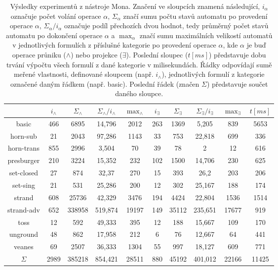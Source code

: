 \begin{table}
    \centering
    \begin{tabular}{ |c||c|c|c|c||c|c|c|c||c| } 
        \hline
         & $i_{\wedge}$ & $\Sigma_{\wedge}$ & $\Sigma_{\wedge} / i_{\wedge}$ & $\max_{\wedge}$ & $i_{\exists}$ & $\Sigma_{\exists}$ & $\Sigma_{\exists} / i_{\exists}$ & $\max_{\exists}$ & $t[ms]$ \\ 
        \hline\hline
        basic & 466 & 6895 & 14,796 & 2012 & 263 & 1369 & 5,205 & 839 & 5653 \\ 
        \hline
        horn-sub & 21 & 2043 & 97,286 & 1143 & 33 & 753 & 22,818 & 699 & 336 \\
        \hline 
        horn-trans & 855 & 2996 & 3,504 & 70 & 39 & 78 & 2 & 12 & 616 \\
        \hline 
        presburger & 210 & 3224 & 15,352 & 232 & 102 & 1500 & 14,706 & 230 & 625 \\
        \hline
        set-closed & 27 & 874 & 32,37 & 270 & 15 & 393 & 26,2 & 203 & 206 \\ 
        \hline
        set-sing & 21 & 531 & 25,286 & 200 & 12 & 302 & 25,167 & 188 & 174 \\
        \hline 
        strand & 608 & 25736 & 42,329 & 3476 & 194 & 4424 & 22,804 & 1536 & 1514 \\ 
        \hline 
        strand-adv & 652 & 338958 & 519,874 & 19197 & 149 & 35112 & 235,651 & 17677 & 919 \\
        \hline 
        toss & 12 & 592 & 49,333 & 395 & 12 & 188 & 15,667 & 109 & 170 \\
        \hline 
        unground & 48 & 862 & 17,958 & 212 & 6 & 76 & 12,667 & 64 & 441 \\
        \hline 
        veanes & 69 & 2507 & 36,333 & 1304 & 55 & 997 & 18,127 & 609 & 771 \\
        \hline\hline
        $\Sigma$ & 2989 & 385218 & 854,421 & 28511 & 880 & 45192 & 401,012 & 22166 & 11425 \\
        \hline
    \end{tabular}
    \caption{Výsledky experimentů z nástroje Mona. Značení ve sloupcích znamená následující, $i_{\alpha}$ označuje počet volání operace $\alpha$, $\Sigma_{\alpha}$ značí sumu počtu stavů automatu po provedení operace $\alpha$, $\Sigma_{\alpha} / i_{\alpha}$ označuje podíl přechozích dvou hodnot, tedy průměrný počet stavů automatu po dokončení operace $\alpha$ a $\max_{\alpha}$ značí sumu maximálních velikostí automatů v jednotlivých formulích z příslušné kategorie po provedení operace $\alpha$, kde $\alpha$ je buď operace průniku ($\wedge$) nebo projekce ($\exists$). Poslední sloupec ($t[ms]$) představuje dobu trvání výpočtu všech formulí z dané kategorie v milisekundách. Řádky odpovídají sumě meřené vlastnosti, definované sloupcem (např. $i_{\wedge}$), jednotlivých formulí z kategorie označené daným řádkem (např. basic). Poslední řádek (značen $\Sigma$) představuje součet daného sloupce.}
    \label{exp1_tbl2}
\end{table}

